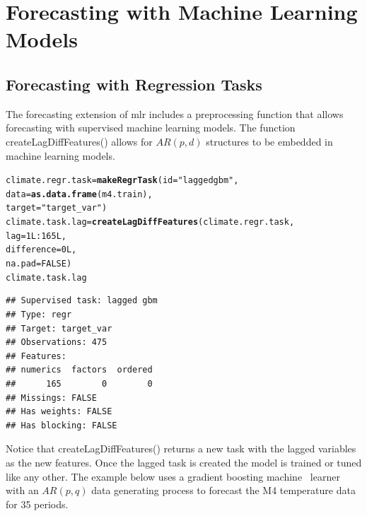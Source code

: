 \documentclass[12pt]{article}\usepackage[]{graphicx}\usepackage[]{color}
\makeatletter
\newcommand{\hlnum}[1]{\textcolor[rgb]{0.686,0.059,0.569}{#1}}%
\newcommand{\hlstr}[1]{\textcolor[rgb]{0.192,0.494,0.8}{#1}}%
\newcommand{\hlopt}[1]{\textcolor[rgb]{0,0,0}{#1}}%
\newcommand{\hlstd}[1]{\textcolor[rgb]{0.345,0.345,0.345}{#1}}%
\newcommand{\hlkwb}[1]{\textcolor[rgb]{0.69,0.353,0.396}{#1}}%
\newcommand{\hlkwc}[1]{\textcolor[rgb]{0.333,0.667,0.333}{#1}}%
\newcommand{\hlkwd}[1]{\textcolor[rgb]{0.737,0.353,0.396}{\textbf{#1}}}%
\newenvironment{kframe}{%
 \def\at@end@of@kframe{}%
 \ifinner\ifhmode%
  \def\at@end@of@kframe{\end{minipage}}%
  \begin{minipage}{\columnwidth}%
 \fi\fi%
 \def\FrameCommand##1{\hskip\@totalleftmargin \hskip-\fboxsep
 \colorbox{shadecolor}{##1}\hskip-\fboxsep
     \hskip-\linewidth \hskip-\@totalleftmargin \hskip\columnwidth}%
 \MakeFramed {\advance\hsize-\width
   \@totalleftmargin\z@ \linewidth\hsize
   \@setminipage}}%
 {\par\unskip\endMakeFramed%
 \at@end@of@kframe}
\newenvironment{knitrout}{}{} %
\theoremstyle{definition}
\newcommand\code{\@codex}
\def\@codex#1{{\normalfont\ttfamily\hyphenchar\font=-1 #1}}
\newcommand{\pkg}[1]{{\fontseries{b}\selectfont #1}}
\makeatother
\begin{document}
\section{Forecasting with Machine Learning Models}
\label{sec:preproc}
\subsection{Forecasting with Regression Tasks}
\label{sec:preprocAR}
\doublespacing
The forecasting extension of \pkg{mlr} includes a preprocessing function that allows forecasting with supervised machine learning models. The function \code{createLagDiffFeatures()} allows for $AR(p,d)$ structures to be embedded in machine learning models.
\singlespacing
\begin{knitrout}
\color{fgcolor}\begin{kframe}
\begin{alltt}
\hlstd{climate.regr.task} \hlkwb{=} \hlkwd{makeRegrTask}\hlstd{(}\hlkwc{id} \hlstd{=} \hlstr{"lagged gbm"}\hlstd{,}
                                 \hlkwc{data} \hlstd{=} \hlkwd{as.data.frame}\hlstd{(m4.train),}
                                 \hlkwc{target} \hlstd{=} \hlstr{"target_var"}\hlstd{)}
\hlstd{climate.task.lag} \hlkwb{=} \hlkwd{createLagDiffFeatures}\hlstd{(climate.regr.task,}
                                         \hlkwc{lag} \hlstd{=} \hlnum{1L}\hlopt{:}\hlnum{165L}\hlstd{,}
                                         \hlkwc{difference} \hlstd{=} \hlnum{0L}\hlstd{,}
                                         \hlkwc{na.pad}\hlstd{=}\hlnum{FALSE}\hlstd{)}
\hlstd{climate.task.lag}
\end{alltt}
\begin{verbatim}
## Supervised task: lagged gbm
## Type: regr
## Target: target_var
## Observations: 475
## Features:
## numerics  factors  ordered 
##      165        0        0 
## Missings: FALSE
## Has weights: FALSE
## Has blocking: FALSE
\end{verbatim}
\end{kframe}
\end{knitrout}
\doublespacing

Notice that \code{createLagDiffFeatures()} returns a new task with the lagged variables as the new features. Once the lagged task is created the model is trained or tuned like any other. The example below uses a gradient boosting machine~\cite{gbm} learner with an $AR(p,q)$ data generating process to forecast the M4 temperature data for 35 periods.
\end{document}
